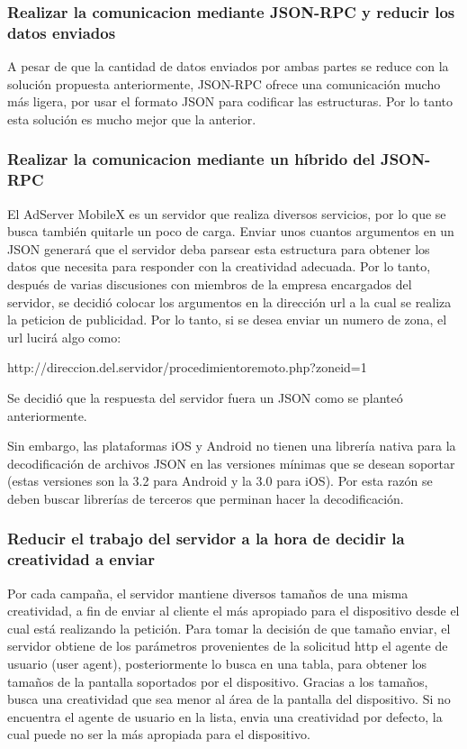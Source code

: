 \subsubsection*{Realizar la comunicacion mediante JSON-RPC y reducir los datos enviados}

A pesar de que la cantidad de datos enviados por ambas partes se reduce
con la solución propuesta anteriormente, JSON-RPC ofrece una comunicación
mucho más ligera, por usar el formato JSON para codificar las estructuras.
Por lo tanto esta solución es mucho mejor que la anterior. 


\subsubsection*{Realizar la comunicacion mediante un híbrido del JSON-RPC}

El AdServer MobileX es un servidor que realiza diversos servicios,
por lo que se busca también quitarle un poco de carga. Enviar unos
cuantos argumentos en un JSON generará que el servidor deba parsear
esta estructura para obtener los datos que necesita para responder
con la creatividad adecuada. Por lo tanto, después de varias discusiones
con miembros de la empresa encargados del servidor, se decidió colocar
los argumentos en la dirección url a la cual se realiza la peticion
de publicidad. Por lo tanto, si se desea enviar un numero de zona,
el url lucirá algo como:

\begin{center}
http://direccion.del.servidor/procedimientoremoto.php?zoneid=1
\par\end{center}

Se decidió que la respuesta del servidor fuera un JSON como se planteó
anteriormente.

Sin embargo, las plataformas iOS y Android no tienen una librería
nativa para la decodificación de archivos JSON en las versiones mínimas
que se desean soportar (estas versiones son la 3.2 para Android y
la 3.0 para iOS). Por esta razón se deben buscar librerías de terceros
que perminan hacer la decodificación.


\subsubsection{Reducir el trabajo del servidor a la hora de decidir la creatividad
a enviar}

Por cada campaña, el servidor mantiene diversos tamaños de una misma
creatividad, a fin de enviar al cliente el más apropiado para el dispositivo
desde el cual está realizando la petición. Para tomar la decisión
de que tamaño enviar, el servidor obtiene de los parámetros provenientes
de la solicitud http el agente de usuario (user agent), posteriormente
lo busca en una tabla, para obtener los tamaños de la pantalla soportados
por el dispositivo. Gracias a los tamaños, busca una creatividad que
sea menor al área de la pantalla del dispositivo. Si no encuentra
el agente de usuario en la lista, envia una creatividad por defecto,
la cual puede no ser la más apropiada para el dispositivo.

